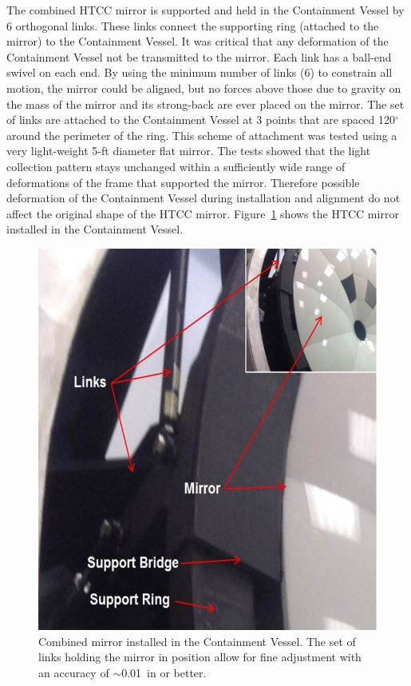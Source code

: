 The combined HTCC mirror is supported and held in the Containment Vessel by 6 orthogonal links. These links
connect the supporting ring (attached to the mirror) to the Containment Vessel. It was critical that any deformation
of the Containment Vessel not be transmitted to the mirror. Each link has a ball-end swivel on each end. By using the
minimum number of links (6) to constrain all motion, the mirror could be aligned, but no forces above those due to
gravity on the mass of the mirror and its strong-back are ever placed on the mirror. The set of links are attached to
the Containment Vessel at 3 points that are spaced 120$^\circ$ around the perimeter of the ring. This scheme of
attachment was tested using a very light-weight 5-ft diameter flat mirror. The tests showed that the light collection
pattern stays unchanged within a sufficiently wide range of deformations of the frame that supported the mirror.
Therefore possible deformation of the Containment Vessel during installation and alignment do not affect the original
shape of the HTCC mirror. Figure~\ref{fig:HTCC_MIRR_INST_NEW} shows the HTCC mirror installed in the
Containment Vessel.

\begin{figure}[ht]
    \centering
    \includegraphics[width=1.0\linewidth,trim={0 0cm 0 0},clip]{images/HTCC_MIRR_INST_NEW.jpg}
    \caption{Combined mirror installed in the Containment Vessel. The set of links holding the mirror in position
      allow for fine adjustment with an accuracy of $\sim$0.01~in or better.}
    \label{fig:HTCC_MIRR_INST_NEW}
\end{figure}

